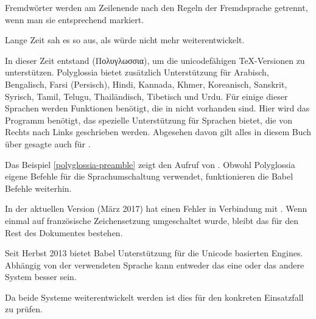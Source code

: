 Fremdwörter werden am Zeilenende nach den Regeln der Fremdsprache getrennt,
wenn man sie entsprechend markiert.

Lange Zeit sah es so aus, als würde  nicht mehr weiterentwickelt.

In dieser Zeit entstand  (Πολυγλωσσια), um die unicodefähigen \TeX{}-Versionen zu unterstützen.
Polyglossia bietet zusätzlich Unterstützung für Arabisch, Bengalisch, Farsi (Persisch), Hindi, Kannada, Khmer,
Koreanisch, Sanskrit, Syrisch, Tamil, Telugu, Thailändisch, Tibetisch und Urdu.
Für einige dieser Sprachen werden Funktionen benötigt, die in \LuaLaTeX{} nicht vorhanden sind.
Hier wird das Programm \XeLaTeX{} benötigt, das spezielle Unterstützung für Sprachen bietet,
die von Rechts nach Links geschrieben werden. Abgesehen davon gilt alles in diesem Buch über
\LuaLaTeX{} gesagte auch für \XeLaTeX{}.

Das Beispiel \ref{polyglossia-preamble} zeigt den Aufruf von .
Obwohl Polyglossia eigene Befehle für die Sprachumschaltung verwendet, 
funktionieren die Babel Befehle weiterhin.

In der aktuellen Version (März 2017) hat  einen Fehler in Verbindung mit \LuaLaTeX{}.
Wenn einmal auf französische Zeichensetzung umgeschaltet wurde, bleibt das für den Rest des Dokumentes bestehen.

Seit Herbst 2013 bietet Babel Unterstützung für die Unicode basierten Engines.
Abhängig von der verwendeten Sprache kann entweder das eine oder das andere System besser sein.

Da beide Systeme weiterentwickelt werden ist dies für den konkreten Einsatzfall zu prüfen.



